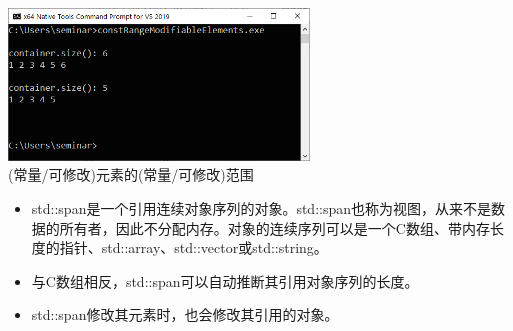 \begin{center}
\includegraphics[width=0.6\textwidth]{content/3/chapter5/images/9.png}\\
(常量/可修改)元素的(常量/可修改)范围
\end{center}

\begin{tcolorbox}[breakable,enhanced jigsaw,colback=mygreen!5!white,colframe=mygreen!75!black,title={总结}]

\begin{itemize}
\item 
std::span是一个引用连续对象序列的对象。std::span也称为视图，从来不是数据的所有者，因此不分配内存。对象的连续序列可以是一个C数组、带内存长度的指针、std::array、std::vector或std::string。

\item 
与C数组相反，std::span可以自动推断其引用对象序列的长度。

\item 
std::span修改其元素时，也会修改其引用的对象。
\end{itemize}

\end{tcolorbox}

\newpage








